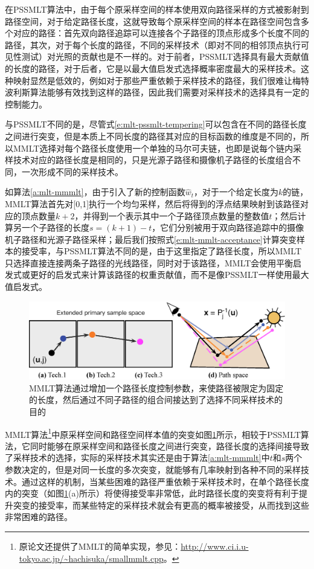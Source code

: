 在PSSMLT算法中，由于每个原采样空间的样本使用双向路径采样的方式被影射到路径空间，对于给定路径长度，这就导致每个原采样空间的样本在路径空间包含多个对应的路径：首先双向路径追踪可以连接各个子路径的顶点形成多个长度不同的路径，其次，对于每个长度的路径，不同的采样技术（即对不同的相邻顶点执行可见性测试）对光照的贡献也是不一样的。对于前者，PSSMLT选择具有最大贡献值的长度的路径，对于后者，它是以最大值启发式选择概率密度最大的采样技术。这种映射显然是低效的，例如对于那些严重依赖于采样技术的路径，我们很难让梅特波利斯算法能够有效找到这样的路径，因此我们需要对采样技术的选择具有一定的控制能力。

与PSSMLT不同的是，尽管式\ref{e:mlt-pssmlt-tempering}可以包含在不同的路径长度之间进行突变，但是本质上不同长度的路径其对应的目标函数的维度是不同的，所以MMLT选择对每个路径长度使用一个单独的马尔可夫链，也即是说每个链内采样技术对应的路径长度是相同的，只是光源子路径和摄像机子路径的长度组合不同，一次形成不同的采样技术。

如算法\ref{a:mlt-mmmlt}，由于引入了新的控制函数$\hat{w}_t$，对于一个给定长度为$k$的链，MMLT算法首先对[0,1]执行一个均匀采样，然后将得到的浮点结果映射到该路径对应的顶点数量$k+2$，并得到一个表示其中一个子路径顶点数量的整数值$t$；然后计算另一个子路径的长度$s=(k+1)-t$，它们分别被用于双向路径追踪中的摄像机子路径和光源子路径采样；最后我们按照式\ref{e:mlt-mmlt-acceptance}计算突变样本的接受率，与PSSMLT算法不同的是，由于这里指定了路径长度，所以MMLT只选择直接连接两条子路径的光线路径，同时对于该路径，MMLT会使用平衡启发式或更好的启发式来计算该路径的权重贡献值，而不是像PSSMLT一样使用最大值启发式。

\begin{figure}
	\includegraphics[width=1.0\textwidth]{figures/mlt/mmlt}
	\caption{MMLT算法通过增加一个路径长度控制参数，来使路径被限定为固定的长度，然后通过不同子路径的组合间接达到了选择不同采样技术的目的}
	\label{f:mlt-mmlt}
\end{figure}

MMLT算法\footnote{原论文还提供了MMLT的简单实现，参见：\url{http://www.ci.i.u-tokyo.ac.jp/~hachisuka/smallmmlt.cpp}。}中原采样空间和路径空间样本值的突变如图\ref{f:mlt-mmlt}所示，相较于PSSMLT算法，它同时能够在原采样空间和路径长度之间进行突变，路径长度的选择间接导致了采样技术的选择，实际的采样技术其实还是由于算法\ref{a:mlt-mmmlt}中$t$和$s$两个参数决定的，但是对同一长度的多次突变，就能够有几率映射到各种不同的采样技术。通过这样的机制，当某些困难的路径严重依赖于采样技术时，在单个路径长度内的突变（如图\ref{f:mlt-mmlt}(a)所示）将使得接受率非常低，此时路径长度的突变将有利于提升突变的接受率，而某些特定的采样技术就会有更高的概率被接受，从而找到这些非常困难的路径。






